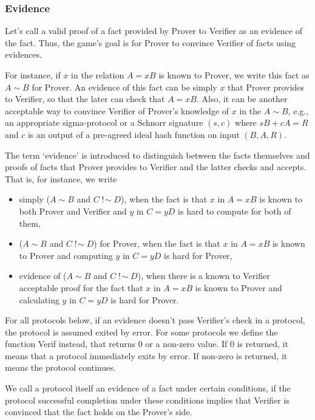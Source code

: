 \documentclass{mathcryptology} %
\DeclareMathOperator{\notsim}{!\!\sim}
\theoremstyle{title}
\theoremstyle{titleof}
\begin{document}
\subsubsection{Evidence}
    Let's call a valid proof of a fact provided by Prover to Verifier as an evidence of the fact. Thus, the game's goal is for Prover to convince Verifier of facts using evidences.

    For instance, if $x$ in the relation $A=xB$ is known to Prover, we write this fact as $A\sim B$ for Prover. An evidence of this fact can be simply $x$ that Prover provides to Verifier, so that the later can check that $A=xB$. Also, it can be another acceptable way to convince Verifier of Prover's knowledge of $x$ in the $A\sim B$, e.g., an appropriate sigma-protocol or a Schnorr signature $\left(s, c\right)$ where $sB+cA=R$ and $c$ is an output of a pre-agreed ideal hash function on input $\left(B, A, R\right)$.

    The term `evidence' is introduced to distinguish between the facts themselves and proofs of facts that Prover provides to Verifier and the latter checks and accepts. That is, for instance, we write
    \begin{itemize}
        \item simply ($A\sim B$ and $C\notsim D$), when the fact is that $x$ in $A=xB$ is known to both Prover and Verifier and $y$ in $C=yD$ is hard to compute for both of them,
        \item ($A\sim B$ and $C\notsim D$) for Prover, when the fact is that $x$ in $A=xB$ is known to Prover and computing $y$ in $C=yD$ is hard  for Prover,
        \item evidence of ($A\sim B$ and $C\notsim D$), when there is a known to Verifier acceptable proof for the fact that $x$ in $A=xB$ is known to Prover and calculating $y$ in $C=yD$ is hard for Prover.        
    \end{itemize}
    
    For all protocols below, if an evidence doesn't pass Verifier's check in a protocol, the protocol is assumed exited by error. For some protocols we define the function Verif instead, that returns $0$ or a non-zero value. If $0$ is returned, it means that a protocol immediately exits by error. If non-zero is returned, it means the protocol continues.
    
    We call a protocol itself an evidence of a fact under certain conditions, if the protocol successful completion under these conditions implies that Verifier is convinced that the fact holds on the Prover's side.  
\end{document}
